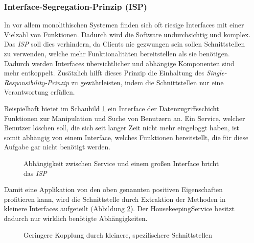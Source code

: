 \documentclass[conference]{IEEEtran}
\begin{document}
\subsubsection{Interface-Segregation-Prinzip (ISP)} In vor allem monolithischen Systemen finden sich oft riesige Interfaces mit einer Vielzahl von Funktionen. Dadurch wird die Software undurchsichtig und komplex. Das \emph{ISP} soll dies verhindern, da Clients nie gezwungen sein sollen Schnittstellen zu verwenden, welche mehr Funktionalitäten bereitstellen als sie benötigen. Dadurch werden Interfaces übersichtlicher und abhängige Komponenten sind mehr entkoppelt. Zusätzlich hilft dieses Prinzip die Einhaltung des \emph{Single-Responsibility-Prinzip} zu gewährleisten, indem die Schnittstellen nur eine Verantwortung erfüllen.  \cite{Martin.2003} \cite{Martin.2018}

Beispielhaft bietet im Schaubild \ref{fig:VorISP} ein Interface der Datenzugriffsschicht Funktionen zur Manipulation und Suche von Benutzern an. Ein Service, welcher Benutzer löschen soll, die sich seit langer Zeit nicht mehr eingeloggt haben, ist somit abhängig von einem Interface, welches Funktionen bereitstellt, die für diese Aufgabe gar nicht benötigt werden. 

\begin{figure}[htbp]
	\small
	
	\caption{Abhängigkeit zwischen Service und einem großen Interface bricht das \emph{ISP} }
	\label{fig:VorISP}
\end{figure}

Damit eine Applikation von den oben genannten positiven Eigenschaften profitieren kann, wird die Schnittstelle durch Extraktion der Methoden in kleinere Interfaces aufgeteilt (Abbildung \ref{fig:NachISP}). Der HousekeepingService besitzt dadurch nur wirklich benötigte Abhängigkeiten. 

\begin{figure}[htbp]
	\small
	
	\caption{Geringere Kopplung durch kleinere, spezifischere Schnittstellen} 
	\label{fig:NachISP}
\end{figure}
\end{document}
